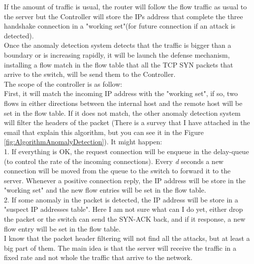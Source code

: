 If the amount of traffic is usual, the router will follow the flow traffic as usual to the server but the Controller will store the IPs address that complete the three handshake connection in a "working set"(for future connection if an attack is detected).\\

Once the anomaly detection system detects that the traffic is bigger than a boundary or is increasing rapidly, it will be launch the defense mechanism, installing a flow match in the flow table that all the TCP SYN packets that arrive to the switch, will be send them to the Controller.\\

The scope of the controller is as follow:\\

First, it will match the incoming IP address with the "working set", if so, two flows in either directions between the internal host and the remote host will be set in the flow table. If it does not match, the other anomaly detection system will filter the headers of the packet (There is a survey that I have attached in the email that explain this algorithm, but you can see it in the Figure \ref{fig:AlgorithmAnomalyDetection}). It might happen:\\

1. If everything is OK, the request connection will be enqueue in the delay-queue (to control the rate of the incoming connections). Every \textit{d} seconds a new connection will be moved from the queue to the switch to forward it to the server. Whenever a positive connection reply, the IP address will be store in the "working set" and the new flow entries will be set in the flow table.\\

2. If some anomaly in the packet is detected, the IP address will be store in a "suspect IP addresses table". Here I am not sure what can I do yet, either drop the packet or the switch can send the SYN-ACK back, and if it response, a new flow entry will be set in the flow table.\\

I know that the packet header filtering will not find all the attacks, but at least a big part of them. The main idea is that the server will receive the traffic in a fixed rate and not whole the traffic that arrive to the network.\\

